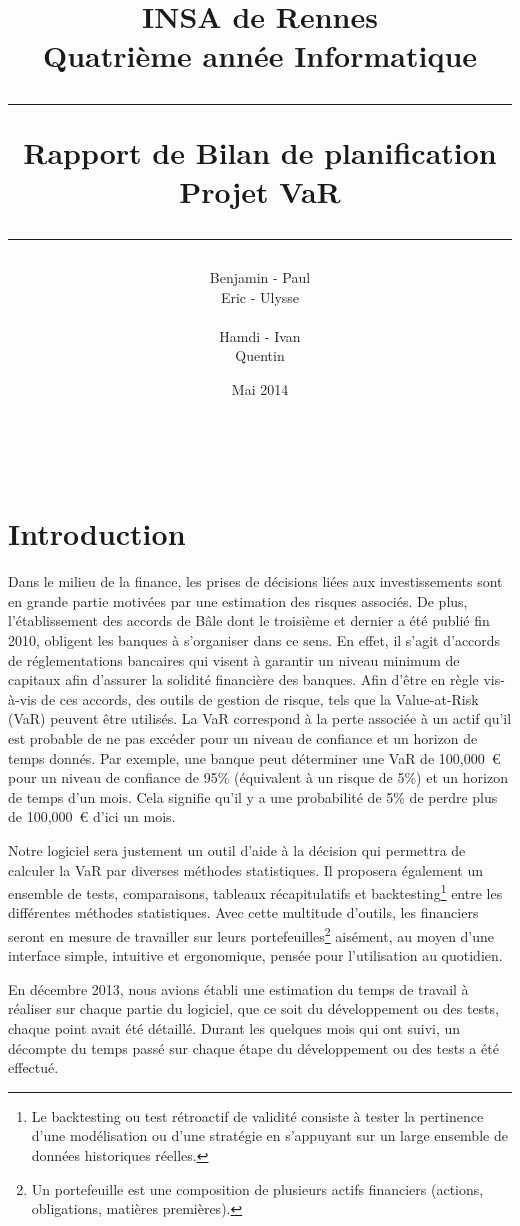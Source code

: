 \documentclass[a4paper]{report}
\title{INSA de Rennes \\ Quatrième année Informatique \\ \bigskip \hrule \bigskip Rapport de Bilan de planification \\ \bigskip Projet VaR \bigskip \hrule}
\author{Benjamin \bsc{Bouguet} - Paul \bsc{Chaignon} \\Eric \bsc{Chauty} - Ulysse \bsc{Goarant} \\ ~~\\
Hamdi \bsc{Raissi} - Ivan \bsc{Le Plumey} \\ Quentin \bsc{Giai Gianetto}}
\date{Mai 2014}
\begin{document}
\maketitle

\thispagestyle{empty}
\newpage

~~
\thispagestyle{empty}
\newpage


\tableofcontents
\newpage


\chapter{Introduction}
Dans le milieu de la finance, les prises de décisions liées aux investissements sont en grande partie motivées par une estimation des risques associés. De plus, l'établissement des accords de Bâle dont le troisième et dernier a été publié fin 2010, obligent les banques à s'organiser dans ce sens. En effet, il s'agit d'accords de réglementations bancaires qui visent à garantir un niveau minimum de capitaux afin d'assurer la solidité financière des banques. Afin d'être en règle vis-à-vis de ces accords, des outils de gestion de risque, tels que la Value-at-Risk (VaR) peuvent être utilisés. La VaR correspond à la perte associée à un actif qu'il est probable de ne pas excéder pour un niveau de confiance et un horizon de temps donnés. Par exemple, une banque peut déterminer une VaR de 100,000~€ pour un niveau de confiance de 95\% (équivalent à un risque de 5\%) et un horizon de temps d'un mois. Cela signifie qu'il y a une probabilité de 5\% de perdre plus de 100,000~€ d'ici un mois. 

Notre logiciel sera justement un outil d'aide à la décision qui permettra de calculer la VaR  par diverses méthodes statistiques. Il proposera également un ensemble de tests, comparaisons, tableaux récapitulatifs et backtesting\footnote{Le backtesting ou test rétroactif de validité consiste à tester la pertinence d'une modélisation ou d'une stratégie en s'appuyant sur un large ensemble de données historiques réelles.} entre les différentes méthodes statistiques. Avec cette multitude d'outils, les financiers seront en mesure de travailler sur leurs portefeuilles\footnote{Un portefeuille est une composition de plusieurs actifs financiers (actions, obligations, matières premières).} aisément, au moyen d’une interface simple, intuitive et ergonomique, pensée pour l'utilisation au quotidien.

En décembre 2013, nous avions établi une estimation du temps de travail à réaliser sur chaque partie du logiciel, que ce soit du développement ou des tests, chaque point avait été détaillé. Durant les quelques mois qui ont suivi, un décompte du temps passé sur chaque étape du développement ou des tests a été effectué.
\end{document}
